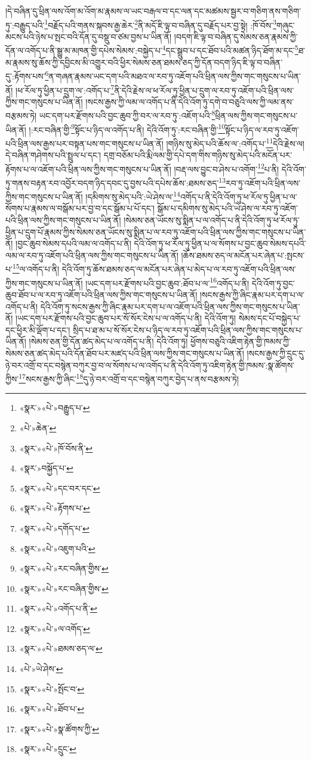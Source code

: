 །དེ་བཞིན་དུ་ཕྲིན་ལས་འོག་མ་འོག་མ་རྣམས་ལ་ཡང་བརྒལ་བ་དང་ལན་དང་མཚམས་སྦྱར་བ་གཅིག་ནས་གཅིག་ཏུ་:བརྒྱུད་པའི་\footnote{«སྣར་»«པེ་»བརྒྱུད་པ་}བརྗོད་པའི་གནས་སྐབས་རྒྱ་ཆེར་\footnote{«པེ་»ཆེན་}ནི་མདོ་ཇི་ལྟ་བ་བཞིན་དུ་བརྗོད་པར་བྱ་སྟེ། :ཁོ་བོས་\footnote{«སྣར་»«པེ་»ཁོ་བོས་ནི་}གཞུང་མངས་པའི་ཉེས་པ་སྤང་བའི་དོན་དུ་བསྡུ་བ་ཙམ་བྱས་པ་ཡིན་ནོ། །བདག་ཇི་ལྟ་བ་བཞིན་དུ་སེམས་ཅན་རྣམས་ཀྱི་དོན་ལ་འགོད་པ་ནི་སྒྱུ་མ་མཁན་གྱི་དཔེས་སེམས་:བསྐྱེད་པ་\footnote{«སྣར་»བསྐྱོད་པ་}དང་སྒྲུབ་པ་དང་ཐོབ་པའི་མཚན་ཉིད་ཐོག་མ་དང་\footnote{«སྣར་»«པེ་»དང་བར་དང་}ཐ་མ་རྣམས་སུ་ཆོས་ཀྱི་དབྱིངས་མི་འགྱུར་བའི་ཕྱིར་སེམས་ཅན་ཐམས་ཅད་ཀྱི་དོན་བདག་ཉིད་ཇི་ལྟ་བ་བཞིན་དུ་:རྟོགས་པས་\footnote{«སྣར་»«པེ་»རྟོགས་པ་}ན་གཞན་རྣམས་ཡང་དག་པའི་མཐའ་ལ་རབ་ཏུ་འཇོག་པའི་ཕྲིན་ལས་ཀྱིས་གང་གསུངས་པ་ཡིན་ནོ། །ཕ་རོལ་ཏུ་ཕྱིན་པ་དྲུག་ལ་:འགོད་པ་\footnote{«སྣར་»«པེ་»དགོད་པ་}ནི་དེའི་རྗེས་ལ་ཕ་རོལ་ཏུ་ཕྱིན་པ་དྲུག་ལ་རབ་ཏུ་འཇོག་པའི་ཕྲིན་ལས་ཀྱིས་གང་གསུངས་པ་ཡིན་ནོ། །སངས་རྒྱས་ཀྱི་ལམ་ལ་འགོད་པ་ནི་དེའི་འོག་ཏུ་དགེ་བ་བཅུའི་ལས་ཀྱི་ལམ་ནས་བརྩམས་ཏེ། ཡང་དག་པར་རྫོགས་པའི་བྱང་ཆུབ་ཀྱི་བར་ལ་རབ་ཏུ་:འཇོག་པའི་\footnote{«སྣར་»«པེ་»འཇུག་པའི་}ཕྲིན་ལས་ཀྱིས་གང་གསུངས་པ་ཡིན་ནོ། །:རང་བཞིན་གྱི་\footnote{«སྣར་»«པེ་»རང་བཞིན་གྱིས་}སྟོང་པ་ཉིད་ལ་འགོད་པ་ནི། དེའི་འོག་ཏུ་:རང་བཞིན་གྱི་\footnote{«སྣར་»«པེ་»རང་བཞིན་གྱིས་}སྟོང་པ་ཉིད་ལ་རབ་ཏུ་འཇོག་པའི་ཕྲིན་ལས་རྒྱས་པར་བསྟན་པས་གང་གསུངས་པ་ཡིན་ནོ། །གཉིས་སུ་མེད་པའི་ཆོས་ལ་:འགོད་པ་\footnote{«སྣར་»«པེ་»འགོད་པ་ནི་}དེའི་རྗེས་ལ། དེ་བཞིན་གཤེགས་པའི་སྤྲུལ་པ་དང་། དགྲ་བཅོམ་པའི་རྨི་ལམ་གྱི་དཔེ་དག་གིས་གཉིས་སུ་མེད་པའི་མངོན་པར་རྟོགས་པ་ལ་འཇོག་པའི་ཕྲིན་ལས་ཀྱིས་གང་གསུངས་པ་ཡིན་ནོ། །བརྡ་ལས་བྱུང་བ་ཤེས་པ་འགོག་\footnote{«སྣར་»«པེ་»ལ་འགོད་}པ་ནི། དེའི་འོག་ཏུ་གནས་བརྟན་རབ་འབྱོར་བདག་ཉིད་དབང་དུ་བྱས་པའི་དཔེས་ཆོས་:ཐམས་ཅད་\footnote{«སྣར་»«པེ་»ཐམས་ཅད་ལ་}རབ་ཏུ་འཇོག་པའི་ཕྲིན་ལས་ཀྱིས་གང་གསུངས་པ་ཡིན་ནོ། །དམིགས་སུ་མེད་པའི་:ཡེ་ཤེས་ལ་\footnote{«པེ་»ཡེ་ཤེས་}འགོད་པ་ནི་དེའི་འོག་ཏུ་ཕ་རོལ་ཏུ་ཕྱིན་པ་ལ་སོགས་པ་རྣམས་ལ་བསྒོམ་པར་བྱ་བ་དང་སྒོམ་པ་པོ་དང་། སྒོམ་པ་དམིགས་སུ་མེད་པའི་ཡེ་ཤེས་ལ་རབ་ཏུ་འཇོག་པའི་ཕྲིན་ལས་ཀྱིས་གང་གསུངས་པ་ཡིན་ནོ། །སེམས་ཅན་ཡོངས་སུ་སྨིན་པ་ལ་འགོད་པ་ནི་དེའི་འོག་ཏུ་ཕ་རོལ་ཏུ་ཕྱིན་པ་དྲུག་པོ་རྣམས་ཀྱིས་སེམས་ཅན་ཡོངས་སུ་སྨིན་པ་ལ་རབ་ཏུ་འཇོག་པའི་ཕྲིན་ལས་ཀྱིས་གང་གསུངས་པ་ཡིན་ནོ། །བྱང་ཆུབ་སེམས་དཔའི་ལམ་ལ་འགོད་པ་ནི། དེའི་འོག་ཏུ་ཕ་རོལ་ཏུ་ཕྱིན་པ་ལ་སོགས་པ་བྱང་ཆུབ་སེམས་དཔའི་ལམ་ལ་རབ་ཏུ་འཇོག་པའི་ཕྲིན་ལས་ཀྱིས་གང་གསུངས་པ་ཡིན་ནོ། །ཆོས་ཐམས་ཅད་ལ་མངོན་པར་ཞེན་པ་:སྤངས་པ་\footnote{«སྣར་»«པེ་»སྤོང་བ་}ལ་འགོད་པ་ནི། དེའི་འོག་ཏུ་ཆོས་ཐམས་ཅད་ལ་མངོན་པར་ཞེན་པ་མེད་པ་ལ་རབ་ཏུ་འཇོག་པའི་ཕྲིན་ལས་ཀྱིས་གང་གསུངས་པ་ཡིན་ནོ། །ཡང་དག་པར་རྫོགས་པའི་བྱང་ཆུབ་:ཐོབ་པ་ལ་\footnote{«སྣར་»«པེ་»ཐོབ་པ་}འགོད་པ་ནི། དེའི་འོག་ཏུ་བྱང་ཆུབ་ཐོབ་པ་ལ་རབ་ཏུ་འཇོག་པའི་ཕྲིན་ལས་ཀྱིས་གང་གསུངས་པ་ཡིན་ནོ། །སངས་རྒྱས་ཀྱི་ཞིང་རྣམ་པར་དག་པ་ལ་འགོད་པ་ནི། དེའི་འོག་ཏུ་སངས་རྒྱས་ཀྱི་ཞིང་རྣམ་པར་དག་པ་ལ་འཇོག་པའི་ཕྲིན་ལས་ཀྱིས་གང་གསུངས་པ་ཡིན་ནོ། །ཡང་དག་པར་རྫོགས་པའི་བྱང་ཆུབ་པར་སོ་སོར་ངེས་པ་ལ་འགོད་པ་ནི། དེའི་འོག་ཏུ། སེམས་དང་པོ་བསྐྱེད་པ་དང་ཕྱིར་མི་ལྡོག་པ་དང་། སྲིད་པ་ཐ་མ་པ་སོ་སོར་ངེས་པ་ཉིད་ལ་རབ་ཏུ་འཇོག་པའི་ཕྲིན་ལས་ཀྱིས་གང་གསུངས་པ་ཡིན་ནོ། །སེམས་ཅན་གྱི་དོན་ཚད་མེད་པ་ལ་འགོད་པ་ནི། དེའི་འོག་ཏུ། ཕྱོགས་བཅུའི་འཇིག་རྟེན་གྱི་ཁམས་ཀྱི་སེམས་ཅན་ཚད་མེད་པའི་དོན་ཐོབ་པར་མཛད་པའི་ཕྲིན་ལས་ཀྱིས་གང་གསུངས་པ་ཡིན་ནོ། །སངས་རྒྱས་ཀྱི་དྲུང་དུ་ཉེ་བར་འགྲོ་བ་དང་བསྙེན་བཀུར་བྱ་བ་ལ་སོགས་པ་ལ་འགོད་པ་ནི་དེའི་འོག་ཏུ་འཇིག་རྟེན་གྱི་ཁམས་:སྣ་ཚོགས་ཀྱིས་\footnote{«སྣར་»«པེ་»སྣ་ཚོགས་ཀྱི་}སངས་རྒྱས་ཀྱི་ཞིང་\footnote{«སྣར་»«པེ་»དྲུང་}དུ་ཉེ་བར་འགྲོ་བ་དང་བསྙེན་བཀུར་བྱེད་པ་ནས་བརྩམས་ཏེ། 